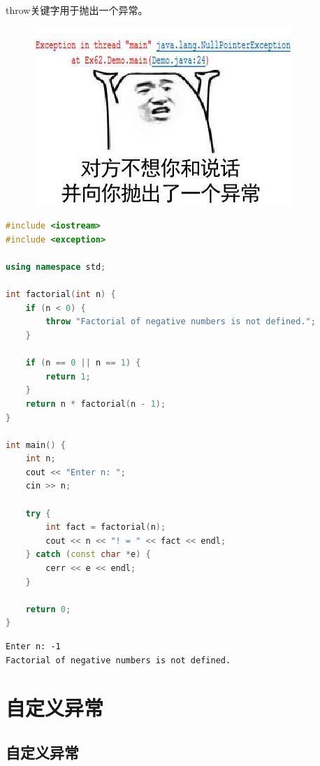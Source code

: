 throw关键字用于抛出一个异常。\\

\begin{figure}[H]
    \centering
    \includegraphics{img/Chapter11/11-1/2.png}
\end{figure}


\begin{lstlisting}[language=C++]
#include <iostream>
#include <exception>

using namespace std;

int factorial(int n) {
    if (n < 0) {
        throw "Factorial of negative numbers is not defined.";
    }

    if (n == 0 || n == 1) {
        return 1;
    }
    return n * factorial(n - 1);
}

int main() {
    int n;
    cout << "Enter n: ";
    cin >> n;

    try {
        int fact = factorial(n);
        cout << n << "! = " << fact << endl;
    } catch (const char *e) {
        cerr << e << endl;
    }

    return 0;
}
\end{lstlisting}

\begin{tcolorbox}
    \begin{verbatim}
Enter n: -1
Factorial of negative numbers is not defined.
	\end{verbatim}
\end{tcolorbox}

\newpage

\section{自定义异常}

\subsection{自定义异常}

